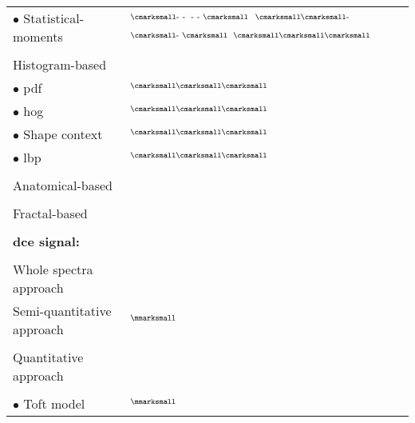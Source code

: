 \begin{longtable}{@{}l >{\raggedleft\arraybackslash}X@{}}
  \quad \quad \quad $\bullet$ Statistical-moments & $^{\text{{\cmarksmall}- -}}$\cite{Ampeliotis2007,Ampeliotis2008,Tiwari2009a,Tiwari2010,Tiwari2013,Viswanath2008,Viswanath2009,Viswanath2012,rampun2016quantitative,rampun2015computer,rampun2016computer} $^{\text{- - {\cmarksmall}}}$\cite{Antic2013} $^{\text{{\cmarksmall}{\cmarksmall}-}}$\cite{Viswanath2011} $^{\text{{\cmarksmall}- {\cmarksmall}}}$\cite{Peng2013,cameron2014multiparametric,cameron2016maps,khalvati2015automated,chung2015prostate} $^{\text{{\cmarksmall}{\cmarksmall}{\cmarksmall}}}$\cite{Litjens2011,Litjens2012,Litjens2014,Niaf2011,Niaf2012,lehaire2014computer} \\ \\ [-1.5ex]
  \quad \quad Histogram-based & \\
  \quad \quad \quad $\bullet$ \acs{pdf} & $^{\text{{\cmarksmall}{\cmarksmall}{\cmarksmall}}}$\cite{Liu2013} \\
  \quad \quad \quad $\bullet$ \acs{hog} & $^{\text{{\cmarksmall}{\cmarksmall}{\cmarksmall}}}$\cite{Liu2013} \\
  \quad \quad \quad $\bullet$ Shape context & $^{\text{{\cmarksmall}{\cmarksmall}{\cmarksmall}}}$\cite{Liu2013} \\
  \quad \quad \quad $\bullet$ \acs{lbp} & $^{\text{{\cmarksmall}{\cmarksmall}{\cmarksmall}}}$\cite{Liu2013} \\ \\ [-1.5ex]
  \quad \quad Anatomical-based & \cite{Litjens2012,Litjens2014,Matulewicz2013,cameron2014multiparametric,cameron2016maps} \\ \\ [-1.5ex]
  \quad \quad Fractal-based & \cite{Lopes2011,Lv2009} \\ \\ [-1.5ex]
  \textbf{\acs*{dce} signal:} & \\ \\ [-1.5ex]
  \quad Whole spectra approach & \cite{Ampeliotis2007,Ampeliotis2008} \\
  \quad Semi-quantitative approach & $^{\text{{\mmarksmall}}}$\cite{Puech2009} \cite{Mazzetti2011,Niaf2011,Niaf2012,Sung2011,trigui2016classification,trigui2017automatic,lehaire2014computer,samarasinghe2016semi,giannini2015fully} \\ \\ [-1.5ex]
  \quad Quantitative approach &  \\ \\ [-1.5ex]
  \quad \quad $\bullet$ Toft model & $^{\text{{\mmarksmall}}}$\cite{Liu2013,Peng2013} \cite{Giannini2013,Langer2009,Litjens2011,Litjens2012,Litjens2014,Mazzetti2011,Niaf2011,Niaf2012,lehaire2014computer,giannini2015fully} \\

\end{longtable}
